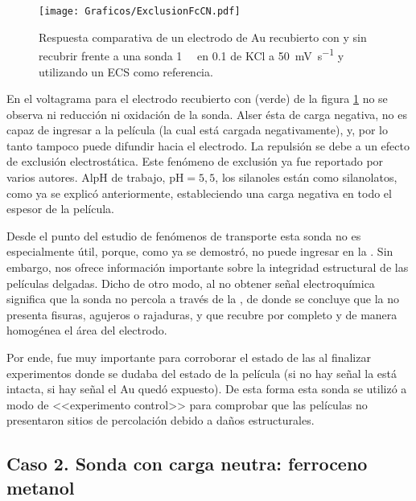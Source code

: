 			\begin{figure}[ht]
				\centering
		 	    \texttt{[image: Graficos/ExclusionFcCN.pdf]}
		        \caption[Exclusión electrostática en \pdmF]{Respuesta comparativa de un electrodo de Au  recubierto con \pdmF\space y sin recubrir frente a una sonda \fe\space \SI{1}{\milli\Molar} en \SI{0.1}{\Molar} de KCl a \SI{50}{\milli\volt\per\second} y utilizando un ECS como referencia.}
		        \label{fig:exclusion_vs_Au}
		      	\end{figure}
	
	 En el voltagrama para el electrodo recubierto con \pdmF\space (verde) de la figura \ref{fig:exclusion_vs_Au} no se observa ni reducción ni oxidación de la sonda. Al\space ser ésta de carga negativa, no es capaz de ingresar a la película (la cual está cargada negativamente), y, por lo tanto tampoco puede difundir hacia el electrodo. La repulsión se debe a un efecto de exclusión electrostática. Este fenómeno de exclusión ya fue reportado por varios autores\cite{alberti2015,schmuhl2005,Andrieu-Brunsen2015,brunsen2011}. Al\space pH de trabajo, $\text{pH}=5,5$, los silanoles están como silanolatos, como ya se explicó anteriormente, estableciendo una carga negativa en todo el espesor de la película.
  
	 Desde el punto del estudio de fenómenos de  transporte esta sonda no es especialmente útil, porque, como ya se demostró, no puede ingresar en la \pdm. Sin embargo, nos ofrece información importante sobre la integridad estructural de las películas delgadas. Dicho de otro modo, al no obtener señal electroquímica significa que la sonda no percola a través de la \pdm, de donde se concluye que la \pdm\space no presenta fisuras, agujeros o rajaduras, y que recubre por completo y de manera homogénea el área del electrodo. 

	 Por ende, fue muy importante para corroborar el estado de las \pdm\space al finalizar experimentos donde se dudaba del estado de la película (si no hay señal la \pdm\space está intacta, si hay señal el Au  quedó expuesto). De esta forma esta sonda se utilizó a modo de <<experimento control>> para comprobar que las películas no presentaron sitios de percolación debido a daños estructurales.

	\subsection{Caso 2. Sonda con carga neutra: ferroceno metanol}

